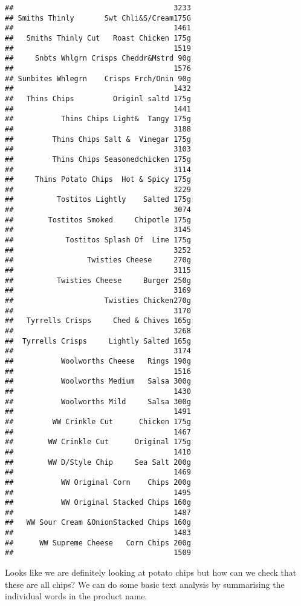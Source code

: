 \documentclass[
]{article}
\begin{document}
\begin{verbatim}
##                                     3233 
## Smiths Thinly       Swt Chli&S/Cream175G 
##                                     1461 
##   Smiths Thinly Cut   Roast Chicken 175g 
##                                     1519 
##     Snbts Whlgrn Crisps Cheddr&Mstrd 90g 
##                                     1576 
## Sunbites Whlegrn    Crisps Frch/Onin 90g 
##                                     1432 
##   Thins Chips         Originl saltd 175g 
##                                     1441 
##           Thins Chips Light&  Tangy 175g 
##                                     3188 
##         Thins Chips Salt &  Vinegar 175g 
##                                     3103 
##         Thins Chips Seasonedchicken 175g 
##                                     3114 
##     Thins Potato Chips  Hot & Spicy 175g 
##                                     3229 
##          Tostitos Lightly    Salted 175g 
##                                     3074 
##        Tostitos Smoked     Chipotle 175g 
##                                     3145 
##            Tostitos Splash Of  Lime 175g 
##                                     3252 
##                 Twisties Cheese     270g 
##                                     3115 
##          Twisties Cheese     Burger 250g 
##                                     3169 
##                     Twisties Chicken270g 
##                                     3170 
##   Tyrrells Crisps     Ched & Chives 165g 
##                                     3268 
##  Tyrrells Crisps     Lightly Salted 165g 
##                                     3174 
##           Woolworths Cheese   Rings 190g 
##                                     1516 
##           Woolworths Medium   Salsa 300g 
##                                     1430 
##           Woolworths Mild     Salsa 300g 
##                                     1491 
##         WW Crinkle Cut      Chicken 175g 
##                                     1467 
##        WW Crinkle Cut      Original 175g 
##                                     1410 
##        WW D/Style Chip     Sea Salt 200g 
##                                     1469 
##           WW Original Corn    Chips 200g 
##                                     1495 
##           WW Original Stacked Chips 160g 
##                                     1487 
##   WW Sour Cream &OnionStacked Chips 160g 
##                                     1483 
##      WW Supreme Cheese   Corn Chips 200g 
##                                     1509
\end{verbatim}

Looks like we are definitely looking at potato chips but how can we
check that these are all chips? We can do some basic text analysis by
summarising the individual words in the product name.
\end{document}
